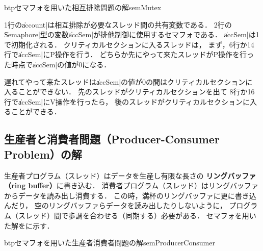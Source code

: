 \begin{myfig}{btp}{セマフォを用いた相互排除問題の解}{semMutex}

\end{myfig}

1行の\|account|は相互排除が必要なスレッド間の共有変数である．
2行の\|Semaphore|型の変数\|accSem|が排他制御に使用するセマフォである．
\|accSem|は1で初期化される．
クリティカルセクションに入るスレッドは，
まず，6行か14行で\|accSem|にP操作を行う．
どちらか先にやって来たスレッドがP操作を行った時点で\|accSem|の値が0になる．

遅れてやって来たスレッドは\|accSem|の値が0の間はクリティカルセクションに
入ることができない．
先のスレッドがクリティカルセクションを出て
8行か16行で\|accSem|にV操作を行ったら，
後のスレッドがクリティカルセクションに入ることができる．

\subsection{生産者と消費者問題（Producer-Consumer Problem）の解}
生産者プログラム（スレッド）はデータを生産し有限な長さの
{\bf リングバッファ（ring buffer）}に書き込む．
消費者プログラム（スレッド）はリングバッファからデータを読み出し消費する．
この時，満杯のリングバッファに更に書き込んだり，
空のリングバッファらデータを読み出したりしないように，
プログラム（スレッド）間で歩調を合わせる（同期する）必要がある．
セマフォを用いた解をに示す．

\begin{myfig}{btp}{セマフォを用いた生産者消費者問題の解}{semProducerConsumer}

\end{myfig}

